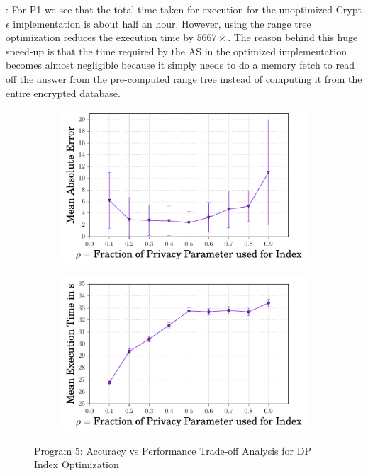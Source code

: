 :
For P1 we see that the total time taken for execution for the unoptimized Crypt$\epsilon$ implementation is about half an hour. However, using the range tree optimization reduces the execution time by $5667\times$. The reason behind this huge speed-up is that the time required by the \textsf{AS} in the optimized implementation becomes almost negligible because it simply needs to do a memory fetch to read off the answer from the pre-computed range tree instead of computing it from the entire encrypted database.
 \begin{figure}[ht]
   \begin{subfigure}[b]{0.45\linewidth}
    \centering \includegraphics[width=1\linewidth]{index_error.pdf}
        \caption{}
        \label{fig:error}\end{subfigure}
        \begin{subfigure}[b]{0.45\linewidth}
        \includegraphics[width=1\linewidth]{index_time.pdf}
        \caption{}
        \label{fig:time}
        \end{subfigure}
        \caption{Program 5: Accuracy vs Performance Trade-off Analysis for DP Index Optimization }\label{index}
    \end{figure}


